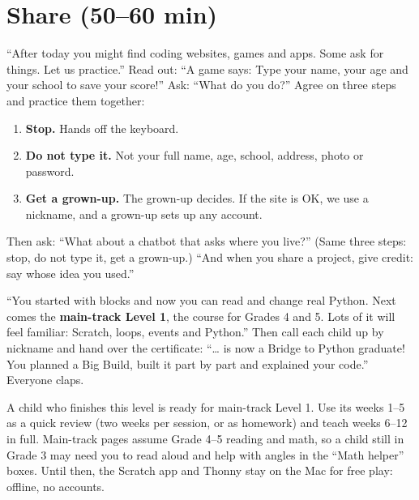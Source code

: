 \section{Share (50--60 min)}
\begin{safety}
\enquote{After today you might find coding websites, games and apps. Some ask for things. Let us practice.} Read out: \enquote{A game says: Type your name, your age and your school to save your score!} Ask: \enquote{What do you do?} Agree on three steps and practice them together:
\begin{enumerate}[leftmargin=1.4em,itemsep=0pt]
  \item \textbf{Stop.} Hands off the keyboard.
  \item \textbf{Do not type it.} Not your full name, age, school, address, photo or password.
  \item \textbf{Get a grown-up.} The grown-up decides. If the site is OK, we use a nickname, and a grown-up sets up any account.
\end{enumerate}
Then ask: \enquote{What about a chatbot that asks where you live?} (Same three steps: stop, do not type it, get a grown-up.) \enquote{And when you share a project, give credit: say whose idea you used.}
\end{safety}

\begin{teacherscript}
\enquote{You started with blocks and now you can read and change real Python. Next comes the \textbf{main-track Level 1}, the course for Grades 4 and 5. Lots of it will feel familiar: Scratch, loops, events and Python.} Then call each child up by nickname and hand over the certificate: \enquote{\ldots{} is now a Bridge to Python graduate! You planned a Big Build, built it part by part and explained your code.} Everyone claps.
\end{teacherscript}

\begin{teachernote}
A child who finishes this level is ready for main-track Level 1. Use its weeks 1--5 as a quick review (two weeks per session, or as homework) and teach weeks 6--12 in full. Main-track pages assume Grade 4--5 reading and math, so a child still in Grade 3 may need you to read aloud and help with angles in the \enquote{Math helper} boxes. Until then, the Scratch app and Thonny stay on the Mac for free play: offline, no accounts.
\end{teachernote}

